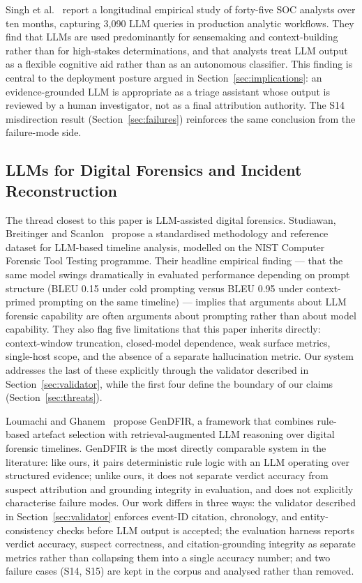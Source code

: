 \documentclass[conference]{IEEEtran}
\begin{document}
Singh et al.~\cite{ref4} report a longitudinal empirical study of forty-five SOC analysts over ten months, capturing 3,090 LLM queries in production analytic workflows. They find that LLMs are used predominantly for sensemaking and context-building rather than for high-stakes determinations, and that analysts treat LLM output as a flexible cognitive aid rather than as an autonomous classifier. This finding is central to the deployment posture argued in Section~\ref{sec:implications}: an evidence-grounded LLM is appropriate as a triage assistant whose output is reviewed by a human investigator, not as a final attribution authority. The S14 misdirection result (Section~\ref{sec:failures}) reinforces the same conclusion from the failure-mode side.

\subsection{LLMs for Digital Forensics and Incident Reconstruction}

The thread closest to this paper is LLM-assisted digital forensics. Studiawan, Breitinger and Scanlon~\cite{ref5} propose a standardised methodology and reference dataset for LLM-based timeline analysis, modelled on the NIST Computer Forensic Tool Testing programme. Their headline empirical finding --- that the same model swings dramatically in evaluated performance depending on prompt structure (BLEU 0.15 under cold prompting versus BLEU 0.95 under context-primed prompting on the same timeline) --- implies that arguments about LLM forensic capability are often arguments about prompting rather than about model capability. They also flag five limitations that this paper inherits directly: context-window truncation, closed-model dependence, weak surface metrics, single-host scope, and the absence of a separate hallucination metric. Our system addresses the last of these explicitly through the validator described in Section~\ref{sec:validator}, while the first four define the boundary of our claims (Section~\ref{sec:threats}).

Loumachi and Ghanem~\cite{ref6} propose GenDFIR, a framework that combines rule-based artefact selection with retrieval-augmented LLM reasoning over digital forensic timelines. GenDFIR is the most directly comparable system in the literature: like ours, it pairs deterministic rule logic with an LLM operating over structured evidence; unlike ours, it does not separate verdict accuracy from suspect attribution and grounding integrity in evaluation, and does not explicitly characterise failure modes. Our work differs in three ways: the validator described in Section~\ref{sec:validator} enforces event-ID citation, chronology, and entity-consistency checks before LLM output is accepted; the evaluation harness reports verdict accuracy, suspect correctness, and citation-grounding integrity as separate metrics rather than collapsing them into a single accuracy number; and two failure cases (S14, S15) are kept in the corpus and analysed rather than removed.
\end{document}
